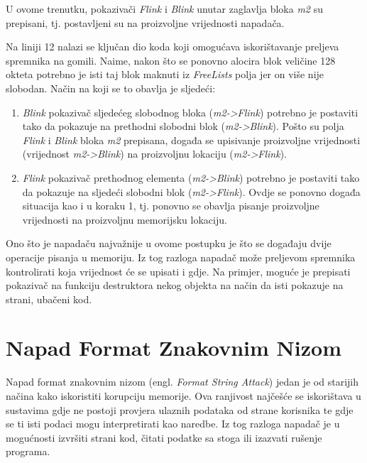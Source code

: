 \documentclass[times, utf8, diplomski, numeric]{fer}
\begin{document}
U ovome trenutku, pokazivači \emph{Flink} i \emph{Blink} unutar zaglavlja bloka \emph{m2} su prepisani, tj. postavljeni su na proizvoljne vrijednosti napadača.

Na liniji 12 nalazi se ključan dio koda koji omogućava iskorištavanje preljeva spremnika na gomili. Naime, nakon što se ponovno alocira blok veličine 128 okteta potrebno je isti taj blok maknuti iz \emph{FreeLists} polja jer on više nije slobodan. Način na koji se to obavlja je sljedeći:
\begin{enumerate}
\item \emph{Blink} pokazivač sljedećeg slobodnog bloka (\emph{m2->Flink}) potrebno je postaviti tako da pokazuje na prethodni slobodni blok (\emph{m2->Blink}). Pošto su polja \emph{Flink} i \emph{Blink} bloka \emph{m2} prepisana, događa se upisivanje proizvoljne vrijednosti (vrijednost \emph{m2->Blink}) na proizvoljnu lokaciju (\emph{m2->Flink}).
\item \emph{Flink} pokazivač prethodnog elementa (\emph{m2->Blink}) potrebno je postaviti tako da pokazuje na sljedeći slobodni blok (\emph{m2->Flink}). Ovdje se ponovno događa situacija kao i u koraku 1, tj. ponovno se obavlja pisanje proizvoljne vrijednosti na proizvoljnu memorijsku lokaciju.
\end{enumerate}
Ono što je napadaču najvažnije u ovome postupku je što se događaju dvije operacije pisanja u memoriju. Iz tog razloga napadač može preljevom spremnika kontrolirati koja vrijednost će se upisati i gdje. Na primjer, moguće je prepisati pokazivač na funkciju destruktora nekog objekta na način da isti pokazuje na strani, ubačeni kod.

\section{Napad Format Znakovnim Nizom}
Napad format znakovnim nizom (engl. \emph{Format String Attack}) jedan je od starijih načina kako iskoristiti korupciju memorije. Ova ranjivost najčešće se iskorištava u sustavima gdje ne postoji provjera ulaznih podataka od strane korisnika te gdje se ti isti podaci mogu interpretirati kao naredbe. Iz tog razloga napadač je u mogućnosti izvršiti strani kod, čitati podatke sa stoga ili izazvati rušenje programa. 
\end{document}
